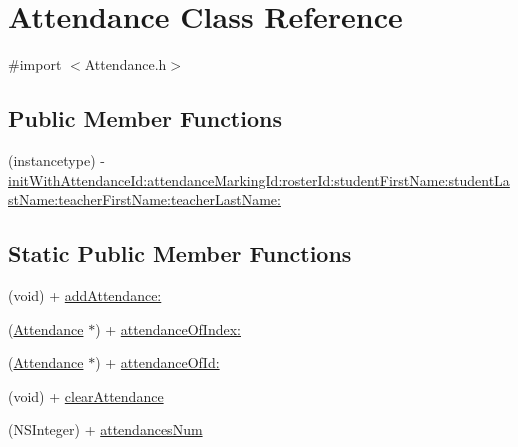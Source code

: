 \hypertarget{interface_attendance}{\section{\-Attendance \-Class \-Reference}
\label{interface_attendance}
}


{\ttfamily \#import $<$\-Attendance.\-h$>$}

\subsection*{\-Public \-Member \-Functions}
\begin{DoxyCompactItemize}
\item 
(instancetype) -\/ \hyperlink{interface_attendance_a68fb6500814d74c3490f561a7d4cc8d1}{init\-With\-Attendance\-Id\-:attendance\-Marking\-Id\-:roster\-Id\-:student\-First\-Name\-:student\-Last\-Name\-:teacher\-First\-Name\-:teacher\-Last\-Name\-:}
\end{DoxyCompactItemize}
\subsection*{\-Static \-Public \-Member \-Functions}
\begin{DoxyCompactItemize}
\item 
(void) + \hyperlink{interface_attendance_a568770e9ffe9657d639935eef3853fd0}{add\-Attendance\-:}
\item 
(\hyperlink{interface_attendance}{\-Attendance} $\ast$) + \hyperlink{interface_attendance_a5cb36b2e19d15648d4286c4806205d0f}{attendance\-Of\-Index\-:}
\item 
(\hyperlink{interface_attendance}{\-Attendance} $\ast$) + \hyperlink{interface_attendance_a3eaa11e5bc98ef472695fd08e6755e19}{attendance\-Of\-Id\-:}
\item 
(void) + \hyperlink{interface_attendance_a80b16d181a194a740fc0c52dede6cbe3}{clear\-Attendance}
\item 
(\-N\-S\-Integer) + \hyperlink{interface_attendance_a5e9f293e1ce3603c9e795e76a06eac88}{attendances\-Num}
\end{DoxyCompactItemize}
